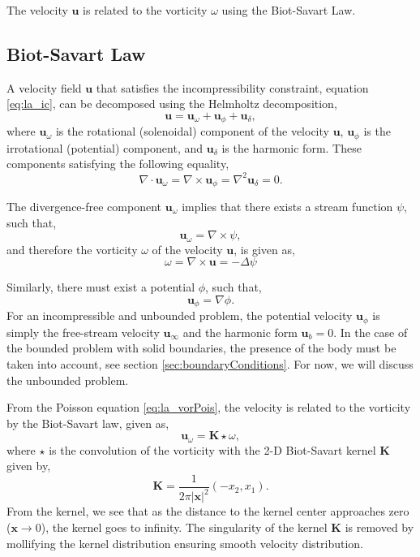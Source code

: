 The velocity $\mathbf{u}$ is related to the vorticity $\omega$ using the Biot-Savart Law.

\subsection{Biot-Savart Law}
A velocity field $\mathbf{u}$ that satisfies the incompressibility constraint, equation \ref{eq:la_ic}, can be decomposed using the Helmholtz decomposition,
	\begin{equation}
	\mathbf{u} = \mathbf{u}_{\omega} + \mathbf{u}_{\phi} + \mathbf{u}_{\delta},
	\label{eq:helmholtz}
	\end{equation}
where $\mathbf{u}_{\omega}$ is the rotational (solenoidal) component of the velocity $\mathbf{u}$, $\mathbf{u}_{\phi}$ is the irrotational (potential) component, and $\mathbf{u}_{\delta}$ is the harmonic form. These components satisfying the following equality,
	\begin{equation}
	\nabla \cdot \mathbf{u}_{\omega} = \nabla \times \mathbf{u}_{\phi} = \nabla^2\mathbf{u}_{\delta} = 0.
	\end{equation}
 
The divergence-free component $\mathbf{u}_{\omega}$ implies that there exists a stream function $\psi$, such that,
	\begin{equation}
	\mathbf{u}_{\omega} = \nabla \times \psi,
	\end{equation} 
and therefore the vorticity $\omega$ of the velocity $\mathbf{u}$, is given as,
	\begin{equation}
	\omega = \nabla \times \mathbf{u} = - \Delta \psi
	\label{eq:la_vorPois}
	\end{equation}

Similarly, there must exist a potential $\phi$, such that,
	\begin{equation}
	\mathbf{u}_{\phi} = \nabla \phi.
	\end{equation}
For an incompressible and unbounded problem, the potential velocity $\mathbf{u}_{\phi}$ is simply the free-stream velocity $\mathbf{u}_{\infty}$ and the harmonic form $\mathbf{u}_b = 0$. In the case of the bounded problem with solid boundaries, the presence of the body must be taken into account, see section \ref{sec:boundaryConditions}. For now, we will discuss the unbounded problem.

From the Poisson equation \ref{eq:la_vorPois}, the velocity is related to the vorticity by the Biot-Savart law, given as,
	\begin{equation}
	\mathbf{u}_{\omega} = \mathbf{K}\star\omega,
	\end{equation}
where $\star$ is the convolution of the vorticity with the 2-D Biot-Savart kernel $\mathbf{K}$ given by,
	\begin{equation}
	\mathbf{K} = \frac{1}{2\pi\left|\mathbf{x}\right|^2}\left(-x_2,x_1\right).
	\label{eq:GreensKernel}
	\end{equation}
From the kernel, we see that as the distance to the kernel center approaches zero ($\mathbf{x} \rightarrow 0$), the kernel goes to infinity. The singularity of the kernel $\mathbf{K}$ is removed by mollifying the kernel distribution ensuring smooth velocity distribution.

